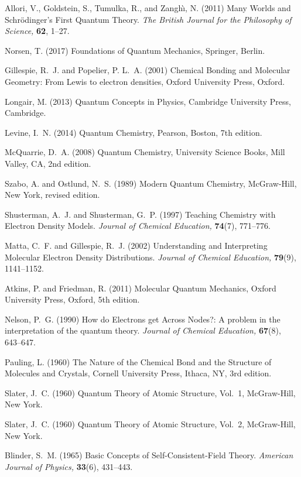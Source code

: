 \documentclass[12pt,onecolumn,secnumarabic,amsmath,amssymb,balancelastpage,nofootinbib]{article}
\begin{document}
\begin{thebibliography}{100}
Allori, V., Goldstein, S., Tumulka, R., and Zangh\`{\i}, N. (2011)
Many Worlds and Schr{\"o}dinger's First Quantum Theory.
{\em The British Journal for the Philosophy of Science,} {\bf 62}, 1--27.

Norsen, T. (2017)
Foundations of Quantum Mechanics,
Springer, Berlin.

Gillespie, R.~J. and Popelier, P. L.~A. (2001)
Chemical Bonding and Molecular Geometry: From Lewis to electron densities,
Oxford University Press, Oxford.

Longair, M. (2013)
Quantum Concepts in Physics,
Cambridge University Press, Cambridge.

Levine, I.~N. (2014)
Quantum Chemistry,
Pearson, Boston, 7th edition.

McQuarrie, D.~A. (2008)
Quantum Chemistry,
University Science Books, Mill Valley, CA, 2nd edition.

Szabo, A. and Ostlund, N.~S. (1989)
Modern Quantum Chemistry,
McGraw-Hill, New York, revised edition.

Shusterman, A.~J. and Shusterman, G.~P. (1997)
Teaching Chemistry with Electron Density Models.
{\em Journal of Chemical Education,} {\bf 74}(7), 771--776.

Matta, C.~F. and Gillespie, R.~J. (2002)
Understanding and Interpreting Molecular Electron Density Distributions.
{\em Journal of Chemical Education,} {\bf 79}(9), 1141--1152.

Atkins, P. and Friedman, R. (2011)
Molecular Quantum Mechanics,
Oxford University Press, Oxford, 5th edition.

Nelson, P.~G. (1990)
How do Electrons get Across Nodes?: A problem in the interpretation of the
  quantum theory.
{\em Journal of Chemical Education,} {\bf 67}(8), 643--647.

Pauling, L. (1960)
The Nature of the Chemical Bond and the Structure of Molecules and Crystals,
Cornell University Press, Ithaca, NY, 3rd edition.

Slater, J.~C. (1960)
Quantum Theory of Atomic Structure, Vol.~1,
McGraw-Hill, New York.

Slater, J.~C. (1960)
Quantum Theory of Atomic Structure, Vol.~2,
McGraw-Hill, New York.

Blinder, S.~M. (1965)
Basic Concepts of Self-Consistent-Field Theory.
{\em American Journal of Physics,} {\bf 33}(6), 431--443.


\end{thebibliography}
\end{document}
